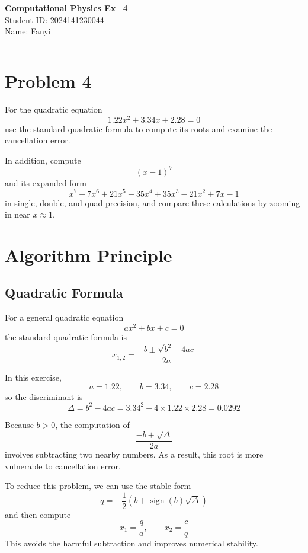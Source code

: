 \documentclass[12pt,a4paper]{article}
\newcommand{\HomeworkTitle}{Computational Physics Ex\_4}
\newcommand{\StudentID}{2024141230044}
\newcommand{\StudentName}{Fanyi}
\begin{document}
\begin{center}
    {\LARGE \textbf{\HomeworkTitle}}\\[1.2em]
    {\large Student ID: \StudentID}\\[0.5em]
    {\large Name: \StudentName}
\end{center}

\vspace{0.5em}
\noindent\rule{\textwidth}{0.8pt}
\vspace{0.5em}

\section*{Problem 4}

For the quadratic equation
\[
1.22x^2+3.34x+2.28=0
\]
use the standard quadratic formula to compute its roots and examine the cancellation error.

In addition, compute
\[
(x-1)^7
\]
and its expanded form
\[
x^7-7x^6+21x^5-35x^4+35x^3-21x^2+7x-1
\]
in single, double, and quad precision, and compare these calculations by zooming in near $x\approx 1$.

\newpage
\tableofcontents
\newpage

\section{Algorithm Principle}

\subsection*{Quadratic Formula}

For a general quadratic equation
\[
ax^2+bx+c=0
\]
the standard quadratic formula is
\[
x_{1,2}=\frac{-b\pm\sqrt{b^2-4ac}}{2a}
\]

In this exercise,
\[
a=1.22,\qquad b=3.34,\qquad c=2.28
\]
so the discriminant is
\[
\Delta=b^2-4ac=3.34^2-4\times 1.22\times 2.28=0.0292
\]

Because $b>0$, the computation of
\[
\frac{-b+\sqrt{\Delta}}{2a}
\]
involves subtracting two nearby numbers. As a result, this root is more vulnerable to cancellation error.

To reduce this problem, we can use the stable form
\[
q=-\frac{1}{2}\left(b+\operatorname{sign}(b)\sqrt{\Delta}\right)
\]
and then compute
\[
x_1=\frac{q}{a},\qquad x_2=\frac{c}{q}
\]
This avoids the harmful subtraction and improves numerical stability.
\end{document}
